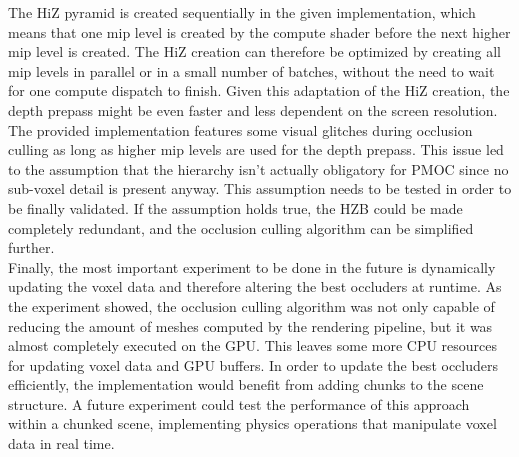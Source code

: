 \clearpage

\noindent
The \ac{HiZ} pyramid is created sequentially in the given implementation, which means that one mip level is 
created by the compute shader before the next higher mip level is created. The \ac{HiZ} creation can therefore 
be optimized by creating all mip levels in parallel or in a small number of batches, without the need to wait 
for one compute dispatch to finish. Given this adaptation of the \ac{HiZ} creation, the depth prepass might be 
even faster and less dependent on the screen resolution. \\

\noindent
The provided implementation features some visual glitches during occlusion culling as long as higher mip levels 
are used for the depth prepass. This issue led to the assumption that the hierarchy isn't actually obligatory 
for \ac{PMOC} since no sub-voxel detail is present anyway. This assumption needs to be tested in 
order to be finally validated. If the assumption holds true, the \ac{HZB} could be made completely redundant, and 
the occlusion culling algorithm can be simplified further. \\

\noindent
Finally, the most important experiment to be done in the future is dynamically updating the voxel data and therefore 
altering the best occluders at runtime. As the experiment showed, the occlusion culling algorithm was not only 
capable of reducing the amount of meshes computed by the rendering pipeline, but it was almost completely executed 
on the \ac{GPU}. This leaves some more \ac{CPU} resources for updating voxel data and \ac{GPU} buffers. In order 
to update the best occluders efficiently, the implementation would benefit from adding chunks to the scene structure. 
A future experiment could test the performance of this approach within a chunked scene, implementing physics operations 
that manipulate voxel data in real time. 


